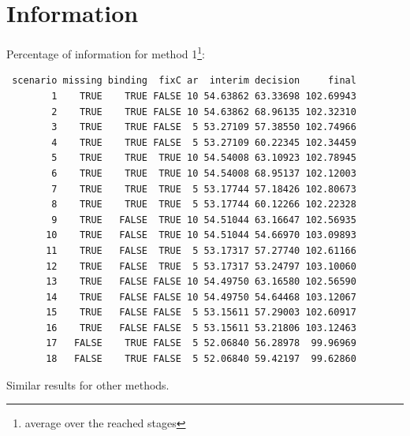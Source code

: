 \documentclass[12pt]{article}
\begin{document}
\clearpage

\section{Information}
\label{sec:org50a7536}

Percentage of information for method 1\footnote{average over the reached stages}:
\begin{verbatim}
 scenario missing binding  fixC ar  interim decision     final
        1    TRUE    TRUE FALSE 10 54.63862 63.33698 102.69943
        2    TRUE    TRUE FALSE 10 54.63862 68.96135 102.32310
        3    TRUE    TRUE FALSE  5 53.27109 57.38550 102.74966
        4    TRUE    TRUE FALSE  5 53.27109 60.22345 102.34459
        5    TRUE    TRUE  TRUE 10 54.54008 63.10923 102.78945
        6    TRUE    TRUE  TRUE 10 54.54008 68.95137 102.12003
        7    TRUE    TRUE  TRUE  5 53.17744 57.18426 102.80673
        8    TRUE    TRUE  TRUE  5 53.17744 60.12266 102.22328
        9    TRUE   FALSE  TRUE 10 54.51044 63.16647 102.56935
       10    TRUE   FALSE  TRUE 10 54.51044 54.66970 103.09893
       11    TRUE   FALSE  TRUE  5 53.17317 57.27740 102.61166
       12    TRUE   FALSE  TRUE  5 53.17317 53.24797 103.10060
       13    TRUE   FALSE FALSE 10 54.49750 63.16580 102.56590
       14    TRUE   FALSE FALSE 10 54.49750 54.64468 103.12067
       15    TRUE   FALSE FALSE  5 53.15611 57.29003 102.60917
       16    TRUE   FALSE FALSE  5 53.15611 53.21806 103.12463
       17   FALSE    TRUE FALSE  5 52.06840 56.28978  99.96969
       18   FALSE    TRUE FALSE  5 52.06840 59.42197  99.62860
\end{verbatim}

Similar results for other methods.
\end{document}

